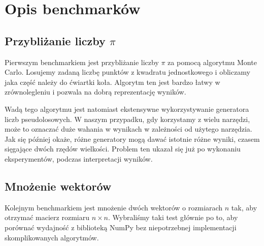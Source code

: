 \section{Opis benchmarków}

\subsection{Przybliżanie liczby $\pi$}

Pierwszym benchmarkiem jest przybliżanie liczby $\pi$ za pomocą
algorytmu Monte Carlo.
Losujemy zadaną liczbę punktów z kwadratu jednostkowego
i obliczamy jaka część należy do ćwiartki koła.
Algorytm ten jest bardzo łatwy w zrównolegleniu
i pozwala na dobrą reprezentację wyników.

Wadą tego algorytmu jest natomiast ekstensywne wykorzystywanie
generatora liczb pseudolosowych.
W naszym przypadku, gdy korzystamy z wielu narzędzi, może
to oznaczać duże wahania w wynikach w zależności od użytego narzędzia.
Jak się później okaże, różne generatory mogą dawać istotnie różne wyniki,
czasem sięgające dwóch rzędów wielkości.
Problem ten ukazał się już po wykonaniu eksperymentów,
podczas interpretacji wyników.

\subsection{Mnożenie wektorów}

Kolejnym benchmarkiem jest mnożenie dwóch wektorów o rozmiarach
$n$ tak, aby otrzymać macierz rozmiaru $n\times n$.
Wybraliśmy taki test głównie po to, aby porównać wydajność
z biblioteką NumPy bez niepotrzebnej implementacji skomplikowanych
algorytmów.
